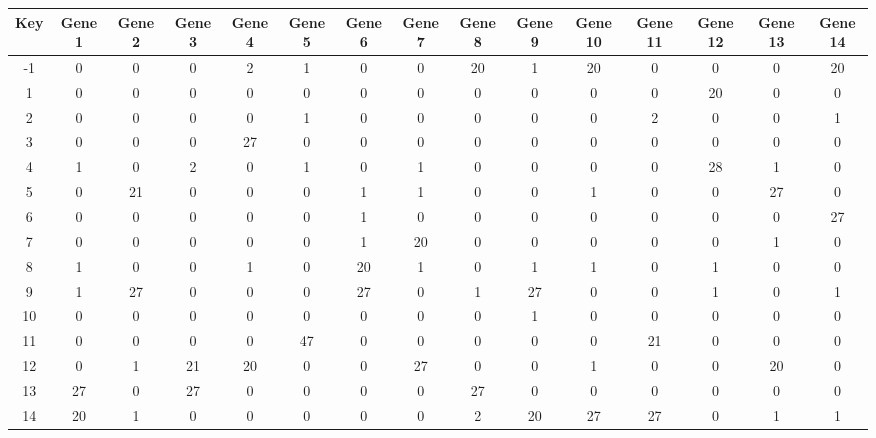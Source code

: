 \begin{tabular}{|c|c|c|c|c|c|c|c|c|c|c|c|c|c|c|}
\hline
Key & Gene 1 & Gene 2 & Gene 3 & Gene 4 & Gene 5 & Gene 6 & Gene 7 & Gene 8 & Gene 9 & Gene 10 & Gene 11 & Gene 12 & Gene 13 & Gene 14 \\
\hline
-1 & 0 & 0 & 0 & 2 & 1 & 0 & 0 & 20 & 1 & 20 & 0 & 0 & 0 & 20 \\
1 & 0 & 0 & 0 & 0 & 0 & 0 & 0 & 0 & 0 & 0 & 0 & 20 & 0 & 0 \\
2 & 0 & 0 & 0 & 0 & 1 & 0 & 0 & 0 & 0 & 0 & 2 & 0 & 0 & 1 \\
3 & 0 & 0 & 0 & 27 & 0 & 0 & 0 & 0 & 0 & 0 & 0 & 0 & 0 & 0 \\
4 & 1 & 0 & 2 & 0 & 1 & 0 & 1 & 0 & 0 & 0 & 0 & 28 & 1 & 0 \\
5 & 0 & 21 & 0 & 0 & 0 & 1 & 1 & 0 & 0 & 1 & 0 & 0 & 27 & 0 \\
6 & 0 & 0 & 0 & 0 & 0 & 1 & 0 & 0 & 0 & 0 & 0 & 0 & 0 & 27 \\
7 & 0 & 0 & 0 & 0 & 0 & 1 & 20 & 0 & 0 & 0 & 0 & 0 & 1 & 0 \\
8 & 1 & 0 & 0 & 1 & 0 & 20 & 1 & 0 & 1 & 1 & 0 & 1 & 0 & 0 \\
9 & 1 & 27 & 0 & 0 & 0 & 27 & 0 & 1 & 27 & 0 & 0 & 1 & 0 & 1 \\
10 & 0 & 0 & 0 & 0 & 0 & 0 & 0 & 0 & 1 & 0 & 0 & 0 & 0 & 0 \\
11 & 0 & 0 & 0 & 0 & 47 & 0 & 0 & 0 & 0 & 0 & 21 & 0 & 0 & 0 \\
12 & 0 & 1 & 21 & 20 & 0 & 0 & 27 & 0 & 0 & 1 & 0 & 0 & 20 & 0 \\
13 & 27 & 0 & 27 & 0 & 0 & 0 & 0 & 27 & 0 & 0 & 0 & 0 & 0 & 0 \\
14 & 20 & 1 & 0 & 0 & 0 & 0 & 0 & 2 & 20 & 27 & 27 & 0 & 1 & 1 \\
\hline
\end{tabular}